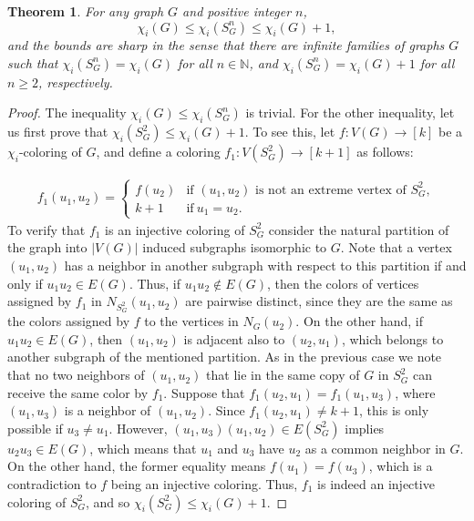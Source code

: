 \documentclass{article}
\newtheorem{theorem}{Theorem}[section]
\begin{document}
\begin{theorem}
\label{thm:main}
For any graph $G$ and positive integer $n$, $$\chi_i(G)\le\chi_i(S_G^n)\le \chi_i(G)+1,$$ and the bounds are sharp in the sense that there are  infinite families of graphs $G$ such that $\chi_i(S_G^n)=\chi_i(G)$ for all $n\in \mathbb{N}$, and $\chi_i(S_G^n)=\chi_i(G)+1$ for all $n\ge 2$, respectively. 
\end{theorem}
\begin{proof}
The inequality $\chi_i(G)\le\chi_i(S_G^n)$ is trivial. 
For the other inequality, let us first prove that $\chi_i(S_G^2)\le \chi_i(G)+1$. To see this, let $f:V(G)\rightarrow [k]$ be a $\chi_i$-coloring of $G$, and define a coloring $f_1:V(S_G^2)\rightarrow [k+1]$ as follows:

\begin{align*}
f_1(u_1,u_2)=
\begin{cases}
f(u_2) & \mbox{if } (u_1,u_2) \mbox{ is not an extreme vertex of } S_G^2,\\
k+1 & \mbox{if}\ u_1=u_2.
\end{cases}
\end{align*}
To verify that $f_1$ is an injective coloring of $S_G^2$ consider the natural partition of the graph into $|V(G)|$ induced subgraphs isomorphic to $G$. Note that a vertex $(u_1,u_2)$ has a neighbor in another subgraph with respect to this partition if and only if $u_1u_2\in E(G)$. Thus, if $u_1u_2\notin E(G)$, then the colors of vertices assigned by $f_1$ in $N_{S_G^2}(u_1,u_2)$ are pairwise distinct, since they are the same as the colors assigned by $f$ to the vertices in $N_G(u_2)$. On the other hand, if $u_1u_2\in E(G)$, then $(u_1,u_2)$ is adjacent also to $(u_2,u_1)$, which belongs to another subgraph of the mentioned partition. As in the previous case we note that no two neighbors of $(u_1,u_2)$ that lie in the same copy of $G$ in $S_G^2$ can receive the same color by $f_1$. Suppose that $f_1(u_2,u_1)=f_1(u_1,u_3)$, where $(u_1,u_3)$ is a neighbor of $(u_1,u_2)$. Since $f_1(u_2,u_1)\ne k+1$, this is only possible if $u_3\ne u_1$. However, $(u_1,u_3)(u_1,u_2)\in E(S_G^2)$ implies $u_2u_3\in E(G)$, which means that $u_1$ and $u_3$ have $u_2$ as a common neighbor in $G$. On the other hand, the former equality means $f(u_1)=f(u_3)$, which is a contradiction to  $f$ being an injective coloring. Thus, $f_1$ is indeed an injective coloring of $S_G^2$, and so $\chi_i(S_G^2)\le \chi_i(G)+1$. 


\end{proof}
\end{document}
